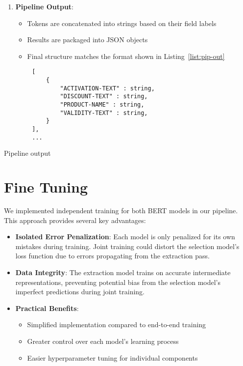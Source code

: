 \documentclass[licencjacka,en]{pracamgr}
\begin{document}
\begin{enumerate}
    \item \textbf{Pipeline Output}:
    \begin{itemize}
        \item Tokens are concatenated into strings based on their field labels
        \item Results are packaged into JSON objects
        \item Final structure matches the format shown in Listing~\ref{list:pip-out}
    \end{itemize}
\end{enumerate}
\begin{center}
   \begin{listing}
        \begin{verbatim}
        [
            {
                "ACTIVATION-TEXT" : string,
                "DISCOUNT-TEXT" : string,
                "PRODUCT-NAME" : string,
                "VALIDITY-TEXT" : string,
            }
        ],
        ...
        \end{verbatim}
        \caption{Pipeline output}
        \label{list:pip-out}
    \end{listing}
\end{center}

\section{Fine Tuning}
We implemented independent training for both BERT models in our pipeline. This approach provides several key advantages:

\begin{itemize}
    \item \textbf{Isolated Error Penalization}: Each model is only penalized for its own mistakes during training. Joint training could distort the selection model's loss function due to errors propagating from the extraction pass.

    \item \textbf{Data Integrity}: The extraction model trains on accurate intermediate representations, preventing potential bias from the selection model's imperfect predictions during joint training.

    \item \textbf{Practical Benefits}:
    \begin{itemize}
        \item Simplified implementation compared to end-to-end training
        \item Greater control over each model's learning process
        \item Easier hyperparameter tuning for individual components
    \end{itemize}
\end{itemize}
\end{document}

